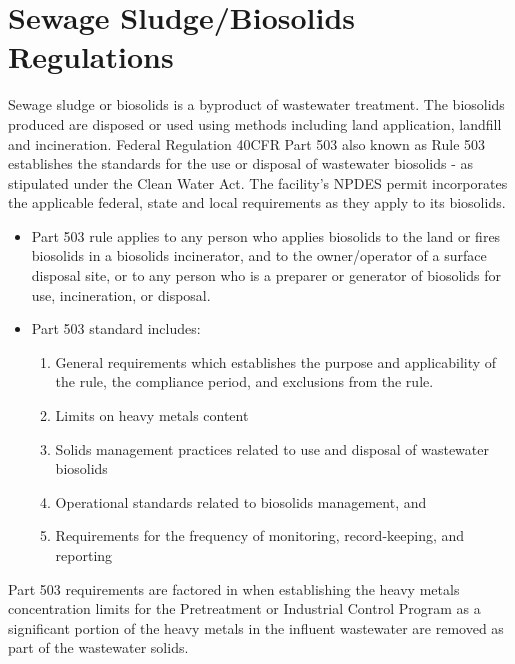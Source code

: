 \section{Sewage Sludge/Biosolids Regulations}
Sewage sludge or biosolids is a byproduct of wastewater treatment.  The biosolids produced are disposed or used using methods including land application, landfill and incineration.  Federal Regulation 40CFR Part 503 also known as Rule 503 establishes the standards for the use or disposal of wastewater biosolids - as stipulated under the Clean Water Act.  The facility's NPDES permit incorporates the applicable federal, state and local requirements as they apply to its biosolids.
			\begin{itemize}
				\item Part 503 rule applies to any person who applies biosolids to the land or fires biosolids in a biosolids incinerator, and to the owner/operator of a surface disposal site, or to any person who is a preparer or generator of biosolids for use, incineration, or disposal.
				\item Part 503 standard includes:
					\begin{enumerate}
						\item General requirements which establishes the purpose and applicability of the rule, the compliance period, and exclusions from the rule.
						\item Limits on heavy metals content
						\item Solids management practices related to use and disposal of wastewater biosolids
						\item Operational standards related to biosolids management, and
						\item Requirements for the frequency of monitoring, record-keeping, and reporting
					\end{enumerate}
			\end{itemize}
Part 503 requirements are factored in when establishing the heavy metals concentration limits for the Pretreatment or Industrial Control Program as a significant portion of the heavy metals in the influent wastewater are removed as part of the wastewater solids.

